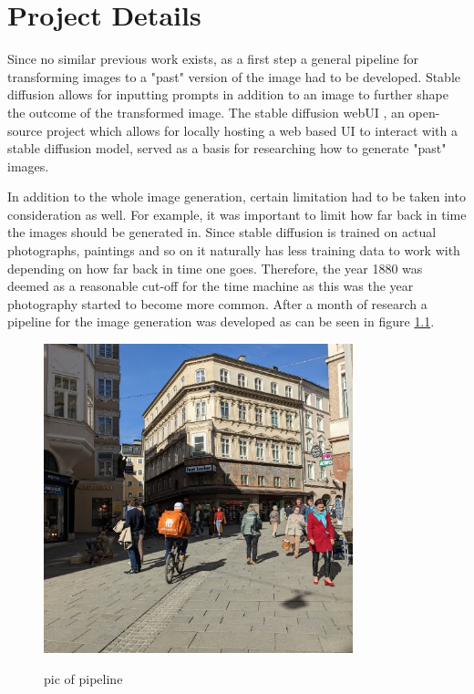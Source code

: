 \documentclass[english,notitlepage,smartquotes]{hgbreport}
\begin{document}
\chapter{Project Details}

Since no similar previous work exists, as a first step a general pipeline for transforming images to a "past" version of the image had to be developed. Stable diffusion allows for inputting prompts in addition to an image to further shape the outcome of the transformed image. The stable diffusion webUI \cite{webui}, an open-source project which allows for locally hosting a web based UI to interact with a stable diffusion model, served as a basis for researching how to generate "past" images.

In addition to the whole image generation, certain limitation had to be taken into consideration as well. For example, it was important to limit how far back in time the images should be generated in. Since stable diffusion is trained on actual photographs, paintings and so on it naturally has less training data to work with depending on how far back in time one goes. Therefore, the year 1880 was deemed as a reasonable cut-off for the time machine as this was the year photography started to become more common. After a month of research a pipeline for the image generation was developed as can be seen in figure \ref{fig:simpPipeline}.

\begin{figure}[htbp]
    \centering\small
    {\includegraphics[width=0.8\textwidth]{images/base_image_Salzburg.jpg}}
    \caption{pic of pipeline}
    \label{fig:simpPipeline}
\end{figure}
\end{document}
